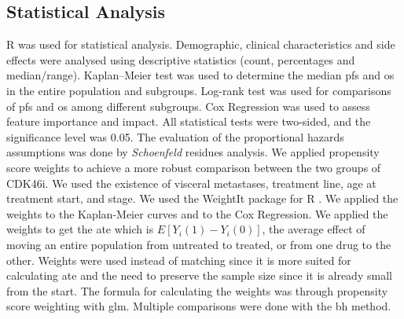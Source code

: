  
\begin{table}
\caption[Descriptive statistics of \acl{cdk46i} group and \acl{et} group.]{Descriptive statistics of \ac{cdk46i} group and \ac{et} group. The Drug/combination refers to the actual drug or the combination for CDK4/6}
\centering
\label{tab:stats_ipop_cdk}

\end{table}




\subsection{Statistical Analysis}
R was used for statistical analysis. Demographic, clinical characteristics and side effects were analysed using descriptive statistics (count, percentages and median/range). Kaplan–Meier test was used to determine the median \ac{pfs} and \ac{os} in the entire population and subgroups. Log-rank test was used for comparisons of \ac{pfs} and \ac{os} among different subgroups. Cox Regression was used to assess feature importance and impact. All statistical tests were two-sided, and the significance level was 0.05. The evaluation of the proportional hazards assumptions was done by \textit{Schoenfeld} residues analysis.
We applied propensity score weights to achieve a more robust comparison between the two groups of CDK4\/6i. We used the existence of visceral metastases, treatment line, age at treatment start, and stage. We used the WeightIt package for R \cite{WeightIt}. We applied the weights to the Kaplan-Meier curves and to the Cox Regression. We applied the weights to get the \ac{ate} which is $E[Y_i(1)-Y_i(0)]$, the average effect of moving an entire population from untreated to treated, or from one drug to the other. Weights were used instead of matching since it is more suited for calculating \ac{ate} and the need to preserve the sample size since it is already small from the start. The formula for calculating the weights was through propensity score weighting with \ac{glm}. Multiple comparisons were done with the \ac{bh} method. 




